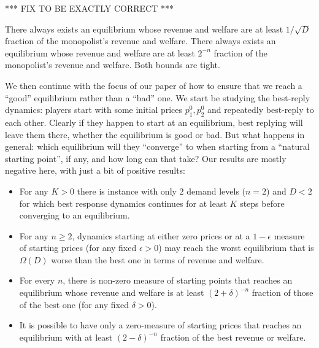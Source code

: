 {\begin{theorem}
*** FIX TO BE EXACTLY CORRECT ***

There always exists an equilibrium whose revenue and welfare are at least $1/\sqrt{D}$
fraction of the monopolist's revenue and welfare.  There always exists an equilibrium whose revenue and welfare are at least $2^{-n}$
fraction of the monopolist's revenue and welfare. Both bounds are tight.
\end{theorem}

We then continue with the focus of our paper of how to ensure that we reach a ``good''
equilibrium rather than a ``bad'' one.  We start be studying the best-reply dynamics: players
start with some initial prices $p_1^0, p_2^0$ and repeatedly best-reply to each other.
Clearly if they happen to start at an equilibrium, best replying will leave them there,
whether the equilibrium is good or bad.  But what happens in general: which equilibrium
will they ``converge'' to when starting from a ``natural starting point'', if any,
and how long can that take?  Our results are mostly negative here, with just a bit of
positive results:

\begin{theorem}
\begin{itemize}
	\item For any $K>0$ there is instance with only $2$ demand levels ($n=2$) and $D<2$ for which best response dynamics continues for at least $K$ steps before converging to an equilibrium.
\item
For any $n \ge 2$, dynamics starting at either zero prices or at a $1-\epsilon$ measure
of starting prices (for any fixed $\epsilon>0$) may reach the worst equilibrium that
is $\Omega(D)$ worse than the best one in terms of revenue and welfare.
\item
For every
$n$, there is non-zero measure of starting points that reaches an equilibrium whose
revenue and welfare is at least $(2+\delta)^{-n}$ fraction of those of the best one
(for any fixed $\delta>0$).
\item
It is possible to have only a zero-measure of starting prices
that reaches an equilibrium with at least $(2-\delta)^{-n}$ fraction of the best
revenue or welfare.
\end{itemize}
\end{theorem}

}
